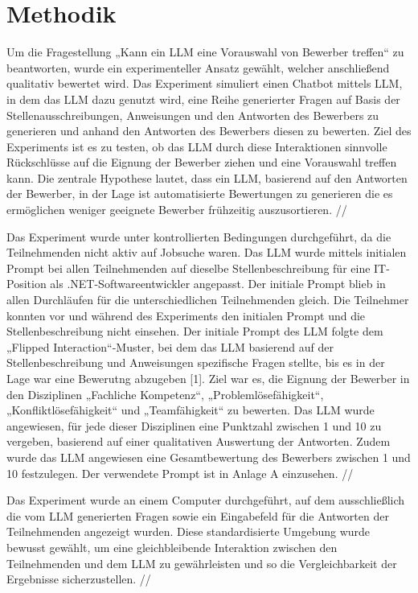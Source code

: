 
\chapter{Methodik}

Um die Fragestellung „Kann ein LLM eine Vorauswahl von Bewerber treffen“ zu beantworten, 
wurde ein experimenteller Ansatz gewählt, welcher anschließend qualitativ bewertet wird. 
Das Experiment simuliert einen Chatbot mittels LLM, in dem das LLM dazu genutzt wird, 
eine Reihe generierter Fragen auf Basis der Stellenausschreibungen,
Anweisungen und den Antworten des Bewerbers zu generieren und anhand den Antworten des Bewerbers 
diesen zu bewerten. Ziel des Experiments ist es zu testen, ob das LLM durch diese Interaktionen 
sinnvolle Rückschlüsse auf die Eignung der Bewerber ziehen und eine Vorauswahl treffen kann. 
Die zentrale Hypothese lautet, dass ein LLM, basierend auf den Antworten der Bewerber, 
in der Lage ist automatisierte Bewertungen zu generieren die es ermöglichen weniger geeignete 
Bewerber frühzeitig auszusortieren. //


Das Experiment wurde unter kontrollierten Bedingungen durchgeführt, 
da die Teilnehmenden nicht aktiv auf Jobsuche waren. 
Das LLM wurde mittels initialen Prompt bei allen Teilnehmenden auf dieselbe Stellenbeschreibung 
für eine IT-Position als .NET-Softwareentwickler angepasst. Der initiale Prompt blieb in allen 
Durchläufen für die unterschiedlichen Teilnehmenden gleich. Die Teilnehmer konnten vor und während 
des Experiments den initialen Prompt und die Stellenbeschreibung nicht einsehen. 
Der initiale Prompt des LLM folgte dem „Flipped Interaction“-Muster, bei dem das LLM basierend 
auf der Stellenbeschreibung und Anweisungen spezifische Fragen stellte, bis es in der Lage war 
eine Bewerutng abzugeben [1]. Ziel war es, die Eignung der Bewerber in den Disziplinen 
„Fachliche Kompetenz“, „Problemlösefähigkeit“, „Konfliktlösefähigkeit“ und „Teamfähigkeit“ zu 
bewerten. Das LLM wurde angewiesen, für jede dieser Disziplinen eine Punktzahl zwischen 1 und 10 
zu vergeben, basierend auf einer qualitativen Auswertung der Antworten. Zudem wurde das LLM 
angewiesen eine Gesamtbewertung des Bewerbers zwischen 1 und 10 festzulegen. Der verwendete Prompt 
ist in Anlage A einzusehen. //


Das Experiment wurde an einem Computer durchgeführt, auf dem ausschließlich die vom LLM 
generierten Fragen sowie ein Eingabefeld für die Antworten der Teilnehmenden angezeigt wurden. 
Diese standardisierte Umgebung wurde bewusst gewählt, um eine gleichbleibende Interaktion zwischen 
den Teilnehmenden und dem LLM zu gewährleisten und so die Vergleichbarkeit der Ergebnisse 
sicherzustellen. //


